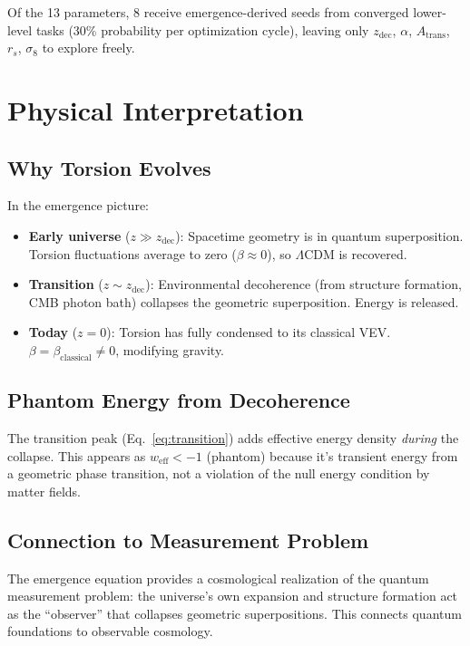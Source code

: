\documentclass[twocolumn,prd,superscriptaddress,nofootinbib]{revtex4-2}
\begin{document}
Of the 13 parameters, 8 receive emergence-derived seeds from converged lower-level tasks (30\% probability per optimization cycle), leaving only $z_\text{dec}$, $\alpha$, $A_\text{trans}$, $r_s$, $\sigma_8$ to explore freely.

\section{Physical Interpretation}

\subsection{Why Torsion Evolves}

In the emergence picture:
\begin{itemize}
\item \textbf{Early universe} ($z \gg z_\text{dec}$): Spacetime geometry is in quantum superposition. Torsion fluctuations average to zero ($\beta \approx 0$), so $\Lambda$CDM is recovered.
\item \textbf{Transition} ($z \sim z_\text{dec}$): Environmental decoherence (from structure formation, CMB photon bath) collapses the geometric superposition. Energy is released.
\item \textbf{Today} ($z = 0$): Torsion has fully condensed to its classical VEV. $\beta = \beta_\text{classical} \neq 0$, modifying gravity.
\end{itemize}

\subsection{Phantom Energy from Decoherence}

The transition peak (Eq.~\ref{eq:transition}) adds effective energy density \emph{during} the collapse. This appears as $w_\text{eff} < -1$ (phantom) because it's transient energy from a geometric phase transition, not a violation of the null energy condition by matter fields.

\subsection{Connection to Measurement Problem}

The emergence equation provides a cosmological realization of the quantum measurement problem: the universe's own expansion and structure formation act as the ``observer'' that collapses geometric superpositions. This connects quantum foundations to observable cosmology.
\end{document}
